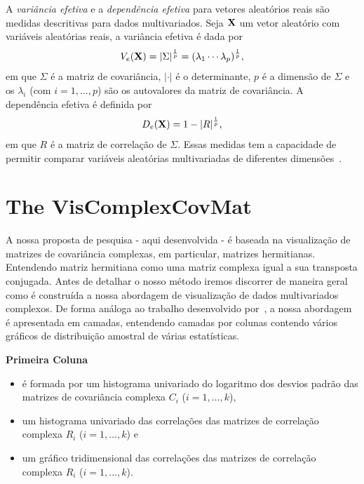 \documentclass[a4paper,12pt]{article}
\begin{document}
A \textit{variância efetiva} e a \textit{dependência efetiva} para vetores aleatórios reais são medidas descritivas para dados multivariados.  Seja ${\bf X}$ um vetor aleatório com variáveis aleatórias reais, a variância efetiva é dada por
$$V_{e}({\bf X})=\vert \Sigma \vert^{\frac{1}{p}}=(\lambda_{1}\cdots \lambda_{p})^{\frac{1}{p}},$$
em que $\Sigma$ é a matriz de covariância, $\vert \cdot \vert$ é o determinante, $p$ é a dimensão de $\Sigma$ e os $\lambda_{i}$ (com $i=1,\ldots, p$) são os autovalores da matriz de covariância. A dependência efetiva é definida por
$$D_{e}({\bf X})= 1-\vert R \vert^{\frac{1}{p}}, $$
em que $R$ é a matriz de correlação de $\Sigma$. 
Essas medidas tem a capacidade de permitir comparar variáveis aleatórias multivariadas de diferentes dimensões~\citep{Pena-2003}. 

\section{The VisComplexCovMat}\label{tres}

A nossa proposta de pesquisa - aqui desenvolvida - é baseada na visualização de matrizes de covariância complexas, em particular, matrizes hermitianas. Entendendo matriz hermitiana como uma matriz complexa igual a sua transposta conjugada. Antes de detalhar o nosso método iremos discorrer de maneira geral como é construída a nossa abordagem de visualização de dados multivariados complexos. De forma análoga ao trabalho desenvolvido por~\citet{tokuda-2011}, a nossa abordagem é apresentada em camadas, entendendo camadas por colunas contendo vários gráficos de distribuição amostral de várias estatísticas.

\begin{flushleft} 
\textbf{Primeira Coluna}
\end{flushleft}

\begin{itemize}
\item é formada por um histograma univariado do logaritmo dos desvios padrão das matrizes de covariância complexa $C_{i}$ ($i=1,\ldots,k$),
\item um histograma univariado das correlações das matrizes de correlação complexa $R_{i}$ ($i=1,\ldots,k$) e
\item  um gráfico tridimensional das correlações das matrizes de correlação complexa $R_{i}$ ($i=1,\ldots,k$).
\end{itemize}
\end{document}
